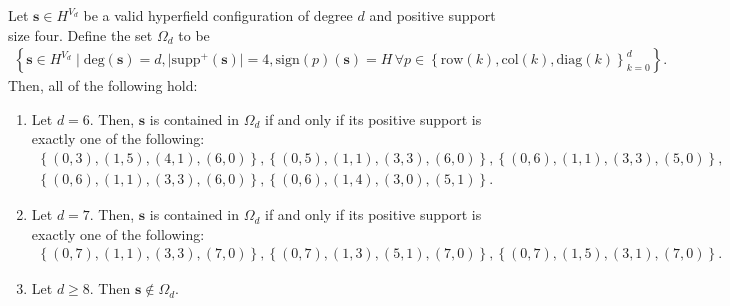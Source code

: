 \begin{proposition}
    Let \( \mathbf{s} \in H^{V_d} \) be a valid hyperfield configuration of degree \( d \) and positive support size four. Define the set \( \Omega_d  \) to be
    \begin{align*}
         \left\{ \mathbf{s} \in H^{V_d} \mid \mathrm{deg}(\mathbf{s}) = d, \lvert \mathrm{supp}^{+}(\mathbf{s}) \rvert = 4, \mathrm{sign}(p)(\mathbf{s}) = H \, \forall p \in \left\{ \mathrm{row}(k), \mathrm{col}(k), \mathrm{diag}(k) \right\}_{k=0}^d \right\}. 
    \end{align*}
    Then, all of the following hold:
    \begin{enumerate}
        \item Let \( d = 6 \). Then, \( \mathbf{s} \) is contained in \( \Omega_d \) if and only if its positive support is exactly one of the following:
        \begin{gather*}
            \left\{ (0,3), (1,5), (4,1), (6,0) \right\},
            \left\{ (0,5), (1,1), (3,3), (6,0) \right\},
            \left\{ (0,6), (1,1), (3,3), (5,0) \right\},\\
            \left\{ (0,6), (1,1), (3,3), (6,0) \right\},
            \left\{ (0,6), (1,4), (3,0), (5,1) \right\}.
        \end{gather*}
        \item Let \( d = 7 \). Then, \( \mathbf{s} \) is contained in \( \Omega_d \) if and only if its positive support is exactly one of the following:
        \begin{gather*}
            \left\{ (0,7), (1,1), (3,3), (7,0) \right\},
            \left\{ (0,7), (1,3), (5,1), (7,0) \right\},
            \left\{ (0,7), (1,5), (3,1), (7,0) \right\}.
        \end{gather*}
        \item Let \( d\geq 8 \). Then \( \mathbf{s}\notin \Omega_d \).
    \end{enumerate}
\end{proposition}